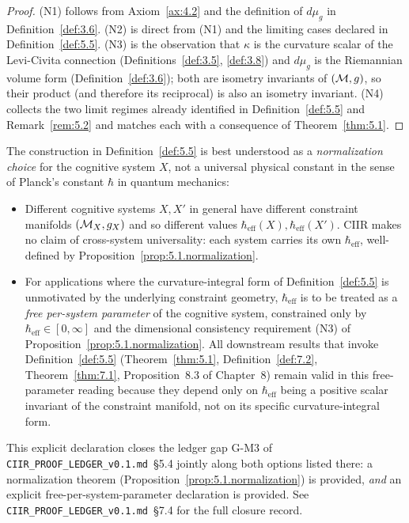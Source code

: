 \begin{proof}
(N1) follows from Axiom~\ref{ax:4.2} and the definition of
$d\mu_g$ in Definition~\ref{def:3.6}.  (N2) is direct from (N1) and
the limiting cases declared in Definition~\ref{def:5.5}.  (N3) is the
observation that $\kappa$ is the curvature scalar of the Levi-Civita
connection (Definitions~\ref{def:3.5}, \ref{def:3.8}) and $d\mu_g$
is the Riemannian volume form (Definition~\ref{def:3.6}); both are
isometry invariants of $(\mathcal{M}, g)$, so their product (and therefore
its reciprocal) is also an isometry invariant.  (N4) collects the
two limit regimes already identified in Definition~\ref{def:5.5}
and Remark~\ref{rem:5.2} and matches each with a consequence of
Theorem~\ref{thm:5.1}.
\end{proof}

\begin{remark}
\label{rem:5.2.scope}
The construction in Definition~\ref{def:5.5} is best understood as a
\emph{normalization choice} for the cognitive system $X$, not a
universal physical constant in the sense of Planck's constant
$\hbar$ in quantum mechanics:
\begin{itemize}
  \item Different cognitive systems $X, X'$ in general have different
    constraint manifolds $(\mathcal{M}_X, g_X)$ and so different values
    $\hbar_{\mathrm{eff}}(X), \hbar_{\mathrm{eff}}(X')$.  CIIR makes
    no claim of cross-system universality: each system carries its
    own $\hbar_{\mathrm{eff}}$, well-defined by
    Proposition~\textup{\ref{prop:5.1.normalization}}.
  \item For applications where the curvature-integral form of
    Definition~\textup{\ref{def:5.5}} is unmotivated by the
    underlying constraint geometry, $\hbar_{\mathrm{eff}}$ is to
    be treated as a \emph{free per-system parameter} of the
    cognitive system, constrained only by
    $\hbar_{\mathrm{eff}} \in [0, \infty]$ and the dimensional
    consistency requirement (N3) of
    Proposition~\textup{\ref{prop:5.1.normalization}}.  All
    downstream results that invoke
    Definition~\textup{\ref{def:5.5}}
    \textup{(}Theorem~\textup{\ref{thm:5.1}},
    Definition~\textup{\ref{def:7.2}},
    Theorem~\textup{\ref{thm:7.1}},
    Proposition~\textup{8.3} of
    Chapter~\textup{8}\textup{)}
    remain valid in this free-parameter reading because they
    depend only on $\hbar_{\mathrm{eff}}$ being a positive scalar
    invariant of the constraint manifold, not on its specific
    curvature-integral form.
\end{itemize}
This explicit declaration closes the ledger gap G-M3 of
\texttt{CIIR\_PROOF\_LEDGER\_v0.1.md}~\S5.4 jointly along both
options listed there: a normalization theorem
(\textup{Proposition~\textup{\ref{prop:5.1.normalization}}}) is
provided, \emph{and} an explicit free-per-system-parameter
declaration is provided.  See \texttt{CIIR\_PROOF\_LEDGER\_v0.1.md}~\S7.4
for the full closure record.
\end{remark}

